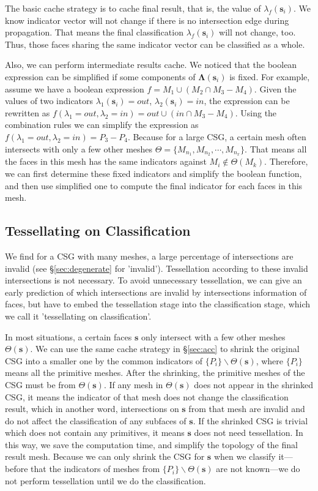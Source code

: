 \documentclass[10pt,journal,compsoc]{IEEEtran}
\begin{document}
The basic cache strategy is to cache final result, that is, the value of $\lambda_f(\bm{s}_i)$. We know indicator vector will not change if there is no intersection edge during propagation. That means the final classification $\lambda_f(\bm{s}_i)$ will not change, too. Thus, those faces sharing the same indicator vector can be classified as a whole.

Also, we can perform intermediate results cache. We noticed that the boolean expression can be simplified if some components of $\boldsymbol{\Lambda}(\bm{s}_i)$ is fixed. For example, assume we have a boolean expression $f = M_1\cup (M_2\cap M_3-M_4)$. Given the values of two indicators $\lambda_1(\bm{s}_i)=out$, $\lambda_2(\bm{s}_i)=in$, the expression can be rewritten as $f(\lambda_1=out, \lambda_2=in)=out\cup (in\cap M_3-M_4)$. Using the combination rules we can simplify the expression as $f(\lambda_1=out, \lambda_2=in)=P_3-P_4$. Because for a large CSG, a certain mesh often intersects with only a few other meshes $\Theta= \{M_{n_1}, M_{n_2}, \cdots, M_{n_x}\}$. That means all the faces in this mesh has the same indicators against $M_{i} \notin \Theta(M_k)$. Therefore, we can first determine these fixed indicators and simplify the boolean function, and then use simplified one to compute the final indicator for each faces in this mesh.



\iffalse
\subsection{Tessellating on Classification}
We find for a CSG with many meshes, a large percentage of intersections are invalid (see \S\ref{sec:degenerate} for 'invalid'). Tessellation according to these invalid intersections is not necessary. To avoid unnecessary tessellation, we can give an early prediction of which intersections are invalid by intersections information of faces, but have to embed the tessellation stage into the classification stage, which we call it 'tessellating on classification'.

In most situations, a certain faces $\bm{s}$ only intersect with a few other meshes $\Theta(\bm{s})$. We can use the same cache strategy in \S\ref{sec:acc} to shrink the original CSG into a smaller one by the common indicators of $\{P_i\}\backslash\Theta(\bm{s})$, where $\{P_i\}$ means all the primitive meshes. After the shrinking, the primitive meshes of the CSG must be from $\Theta(\bm{s})$. If any mesh in $\Theta(\bm{s})$ does not appear in the shrinked CSG, it means the indicator of that mesh does not change the classification result, which in another word, intersections on $\bm{s}$ from that mesh are invalid and do not affect the classification of any subfaces of $\bm{s}$. If the shrinked CSG is trivial which does not contain any primitives, it means $\bm{s}$ does not need tessellation. In this way, we save the computation time, and simplify the topology of the final result mesh. Because we can only shrink the CSG for $\bm{s}$ when we classify it---before that the indicators of meshes from $\{P_i\}\backslash\Theta(\bm{s})$ are not known---we do not perform tessellation until we do the classification.
\end{document}
